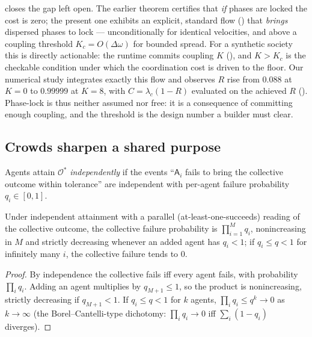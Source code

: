 \documentclass[11pt,twocolumn,a4paper]{article}
\newcommand{\Agent}{\mathsf{A}}
\newcommand{\Ord}{R}                 %
\newcommand{\Out}{\mathcal{O}}       %
\begin{document}
\begin{remark}
\label{rem:lock-commitment}
 closes the gap  left open. The
earlier theorem certifies that \emph{if} phases are locked the cost is
zero; the present one exhibits an explicit, standard flow
() that \emph{brings} dispersed phases to lock ---
unconditionally for identical velocities, and above a coupling threshold
$K_c=O(\Delta\omega)$ for bounded spread. For a synthetic society this is
directly actionable: the runtime commits coupling $K$ (), and
$K>K_c$ is the checkable condition under which the coordination cost is
driven to the floor. Our numerical study integrates exactly this flow and
observes $\Ord$ rise from $0.088$ at $K=0$ to $0.99999$ at $K=8$, with
$C=\lambda_c(1-\Ord)$ evaluated on the achieved $\Ord$
(). Phase-lock is thus neither assumed nor free: it is
a consequence of committing enough coupling, and the threshold is the
design number a builder must clear.
\end{remark}

\subsection{Crowds sharpen a shared purpose}

\begin{definition}
\label{def:indep}
Agents attain $\Out^\ast$ \emph{independently} if the events ``$\Agent_i$
fails to bring the collective outcome within tolerance'' are independent
with per-agent failure probability $q_i\in[0,1]$.
\end{definition}

\begin{theorem}
\label{thm:crowd}
Under independent attainment with a parallel (at-least-one-succeeds)
reading of the collective outcome, the collective failure probability is
$\prod_{i=1}^M q_i$, nonincreasing in $M$ and strictly decreasing whenever
an added agent has $q_i<1$; if $q_i\le q<1$ for infinitely many $i$, the
collective failure tends to $0$.
\end{theorem}

\begin{proof}
By independence the collective fails iff every agent fails, with
probability $\prod_i q_i$. Adding an agent multiplies by $q_{M+1}\le1$, so
the product is nonincreasing, strictly decreasing if $q_{M+1}<1$. If
$q_i\le q<1$ for $k$ agents, $\prod_i q_i\le q^k\to0$ as $k\to\infty$
(the Borel--Cantelli-type dichotomy: $\prod_i q_i\to0$ iff
$\sum_i(1-q_i)$ diverges).
\end{proof}
\end{document}
